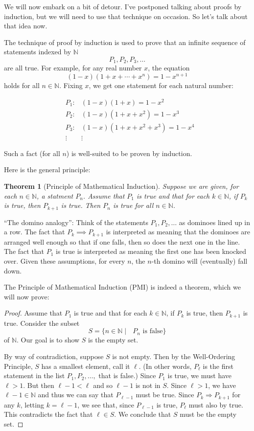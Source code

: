 \documentclass[12pt]{amsart}
\newcommand{\N}{\mathbb{N}}
\numberwithin{equation}{section}
\theoremstyle{plain} %
\newtheorem{thm}[equation]{Theorem}
\theoremstyle{definition}
\theoremstyle{remark}
\begin{document}
We will now embark on a bit of detour. I've postponed talking about proofs by induction, but we will need to use that technique on occasion. So let's talk
about that idea now. 

The technique of proof by induction is used to prove that an infinite sequence of statements indexed by $\N$
$$
P_1, P_2, P_3, \dots
$$
are all true. For example, for any real number $x$, the equation
$$
(1-x)(1+ x + \cdots + x^n) = 1 - x^{n+1}
$$
holds for all $n \in \N$. Fixing $x$, we get one statement for each natural number:

\begin{align*}
	&P_1: &(1-x)(1+x)=1-x^2\\
		&P_2: &(1-x)(1+x+x^2)=1-x^3\\
		&P_3: &(1-x)(1+x+x^2+x^3)=1-x^4\\
		&\vdots &\vdots
	\end{align*}

Such a fact (for all $n$) is well-suited to be proven by induction.

Here is the general principle:

\begin{thm}[Principle of Mathematical Induction] Suppose we are given, for each $n \in \N$, a statment $P_n$.  
Assume that $P_1$ is true and that for each $k
  \in \N$, if $P_k$ is true, then $P_{k+1}$ is true. Then $P_n$ is true for all $n \in \N$.
\end{thm}

``The domino analogy'': Think of the statements $P_1, P_2, \dots$ as dominoes lined up in a row. The fact that $P_k \implies P_{k+1}$ is interpreted as meaning
that the dominoes
are arranged well enough so that if one falls, then so does the next one in the line. The fact that $P_1$ is true is interpreted as meaning the first one has been knocked
over. Given these assumptions, for every $n$, the $n$-th domino will (eventually) fall down. 



The Principle of Mathematical Induction (PMI) is indeed a theorem, which we will now prove:

\begin{proof} 
Assume that $P_1$ is true and that for each $k
  \in \N$, if $P_k$ is true, then $P_{k+1}$ is true.
Consider the subset
$$
S = \{n \in \N \mid \text{ $P_n$ is false} \}
$$
of $\N$. Our goal is to show $S$ is the empty set. 

By way of contradiction, suppose $S$ is not empty. Then
by the Well-Ordering Principle, $S$ has a smallest element, call it $\ell$. (In other words, $P_\ell$ is the first statement in the list $P_1, P_2, \dots, $
that is false.) Since $P_1$ is true, we must have $\ell > 1$. But then
$\ell-1 < \ell$ and so $\ell-1$ is not in $S$. Since $\ell > 1$, we have $\ell-1 \in
\N$ and thus we can say that $P_{\ell-1}$ must be true. 
Since $P_k \Rightarrow P_{k+1}$ for any $k$,  letting $k = \ell-1$, we see that, since $P_{\ell-1}$ is true, $P_{\ell}$ must also by true. This contradicts the fact that $\ell \in S$. We
conclude that $S$ must be the empty set.
\end{proof}
\end{document}
